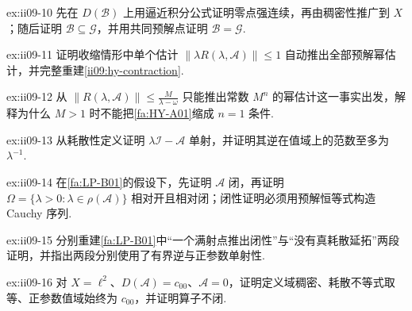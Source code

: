 \begin{FAExercise}[极限半群的强连续与生成元识别]{ex:ii09-10}
先在 \(\displaystyle D(\mathcal B)\) 上用逼近积分公式证明零点强连续，再由稠密性推广到 \(\displaystyle X\)；随后证明 \(\displaystyle\mathcal B\subseteq\mathcal G\)，并用共同预解点证明 \(\displaystyle\mathcal B=\mathcal G\).
\end{FAExercise}

\begin{FAExercise}{ex:ii09-11}
证明收缩情形中单个估计 \(\displaystyle\|\lambda R(\lambda,\mathcal A)\|\leqslant1\) 自动推出全部预解幂估计，并完整重建\autoref{ii09:hy-contraction}.
\end{FAExercise}

\begin{FAExercise}{ex:ii09-12}
从 \(\displaystyle\|R(\lambda,\mathcal A)\|\leqslant \frac{M}{\lambda-\omega}\) 只能推出常数 \(\displaystyle M^n\) 的幂估计这一事实出发，解释为什么 \(\displaystyle M>1\) 时不能把\autoref{fa:HY-A01}缩成 \(\displaystyle n=1\) 条件.
\end{FAExercise}

\begin{FAExercise}[耗散性的基本逆估计]{ex:ii09-13}
从耗散性定义证明 \(\displaystyle\lambda\mathcal I-\mathcal A\) 单射，并证明其逆在值域上的范数至多为 \(\displaystyle\lambda^{-1}\).
\end{FAExercise}

\begin{FAExercise}[单点值域传播]{ex:ii09-14}
在\autoref{fa:LP-B01}的假设下，先证明 \(\displaystyle\mathcal A\) 闭，再证明 \(\displaystyle\Omega=\{\lambda>0:\lambda\in\rho(\mathcal A)\}\) 相对开且相对闭；闭性证明必须用预解恒等式构造 Cauchy 序列.
\end{FAExercise}

\begin{FAExercise}[极大耗散的闭性与极大性]{ex:ii09-15}
分别重建\autoref{fa:LP-B01}中“一个满射点推出闭性”与“没有真耗散延拓”两段证明，并指出两段分别使用了有界逆与正参数单射性.
\end{FAExercise}

\begin{FAExercise}[耗散但非极大耗散的反例]{ex:ii09-16}
对 \(\displaystyle X=\ell^2\)、\(\displaystyle D(\mathcal A)=c_{00}\)、\(\displaystyle\mathcal A=0\)，证明定义域稠密、耗散不等式取等、正参数值域始终为 \(\displaystyle c_{00}\)，并证明算子不闭.
\end{FAExercise}

